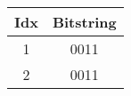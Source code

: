 \documentclass{standalone}
\begin{document}
	\begin{tabular}{cc}
		\toprule
		Idx & Bitstring \\
		\midrule
		\rowcolor{CBOne}
		1 &  0011 \\
		\rowcolor{CBTwo}
		2 & 0011 \\
		\bottomrule
	\end{tabular}
\end{document}
